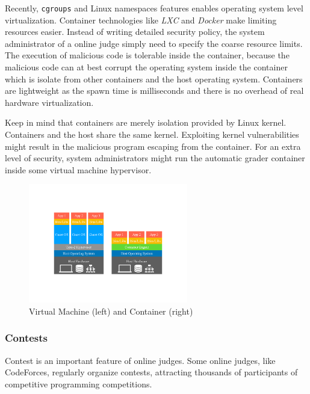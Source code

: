             Recently, \texttt{cgroups} and Linux namespaces features enables operating system level virtualization.
            Container technologies like \emph{LXC} and \emph{Docker} make limiting resources easier.
            Instead of writing detailed security policy,
            the system administrator of a online judge simply need to specify the coarse resource limits.
            The execution of malicious code is tolerable inside the container,
            because the malicious code can at best corrupt the operating system inside the container
            which is isolate from other containers and the host operating system.
            Containers are lightweight as the spawn time is milliseconds and
            there is no overhead of real hardware virtualization.

            Keep in mind that containers are merely isolation provided by Linux kernel.
            Containers and the host share the same kernel.
            Exploiting kernel vulnerabilities might result in the malicious program escaping from the container.
            \cite{shapira_escape_2017}
            For an extra level of security,
            system administrators might run the automatic grader container inside some virtual machine hypervisor.

            \begin{figure}[htp]
                \centering
                \includegraphics[width=0.62\textwidth]{img/isolation.pdf}
                \caption{Virtual Machine (left) and Container (right)}
                \label{fig:isolation}
            \end{figure}

        \subsubsection{Contests}

            Contest is an important feature of online judges.
            Some online judges, like CodeForces, regularly organize contests,
            attracting thousands of participants of competitive programming competitions.

